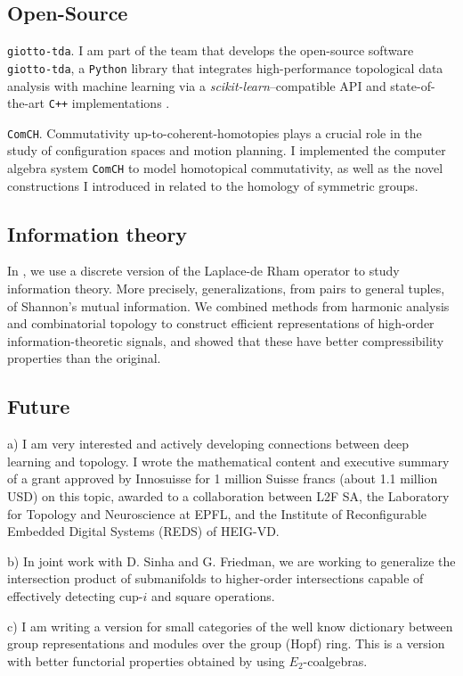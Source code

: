 \subsection{Open-Source} \label{ssec: giotto-tda}
\texttt{giotto-tda}.
I am part of the team that develops the open-source software \texttt{giotto-tda}, a \texttt{Python} library that integrates high-performance topological data analysis with machine learning via a \emph{scikit-learn}--compatible API and state-of-the-art \texttt{C++} implementations \cite{medina2021giotto}.

\texttt{ComCH}.
Commutativity up-to-coherent-homotopies plays a crucial role in the study of configuration spaces and motion planning.
I implemented the computer algebra system \texttt{ComCH} to model homotopical commutativity, as well as the novel constructions I introduced in \cite{medina2020maysteenrod} related to the homology of symmetric groups.

\subsection{Information theory}
In \cite{medina2021hyperharmonic}, we use a discrete version of the Laplace-de Rham operator to study information theory.
More precisely, generalizations, from pairs to general tuples, of Shannon's mutual information.
We combined methods from harmonic analysis and combinatorial topology to construct efficient representations of high-order information-theoretic signals, and showed that these have better compressibility properties than the original.

\subsection{Future}
a) I am very interested and actively developing connections between deep learning and topology.
I wrote the mathematical content and executive summary of a grant approved by Innosuisse for 1 million Suisse francs (about 1.1 million USD) on this topic, awarded to a collaboration between L2F SA, the Laboratory for Topology and Neuroscience at EPFL, and the Institute of Reconfigurable Embedded Digital Systems (REDS) of HEIG-VD.

b) In joint work with D. Sinha and G. Friedman, we are working to generalize the intersection product of submanifolds to higher-order intersections capable of effectively detecting cup-$i$ and square operations.

c) I am writing a version for small categories of the well know dictionary between group representations and modules over the group (Hopf) ring.
This is a version with better functorial properties obtained by using $E_2$-coalgebras.

